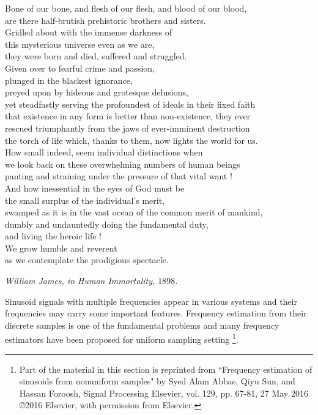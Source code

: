 \documentclass{UCF_ETD}
\begin{document}
\epigraph{ Bone of our bone, and flesh of our flesh, and 
blood of our blood, \\
are there half-brutish prehistoric brothers and sisters.\\
 Gridled about with the immense darkness of \\
 this  mysterious universe even as we are,\\
 they were born and died, suffered and struggled.\\
 Given over to fearful crime and passion,\\
 plunged in the blackest ignorance, \\
 preyed upon by hideous and grotesque delusions,\\
 yet steadfastly serving the profoundest of ideals in their fixed faith\\
 that existence in any form is better than non-existence, they ever \\
 rescued triumphantly from the jaws of ever-imminent destruction\\
 the torch of life which, thanks to them, now lights the world for us. \\
 How small indeed, seem individual distinctions when \\
 we look back on these overwhelming numbers of human beings\\
  panting and straining under the pressure of that vital want !\\
  And how inessential in the eyes of God must be\\
   the small surplus of the individual's merit,\\
   swamped as it is in the vast ocean of the common merit of mankind,\\
   dumbly and undauntedly doing the fundamental duty,\\
   and living the heroic life !\\
   We grow humble and reverent \\ as we contemplate the prodigious spectacle. }
{\itshape William James, in Human Immortality, $1898$.}

Sinusoid signals with multiple frequencies appear in various systems and their frequencies may carry some important features. Frequency estimation from their discrete samples is one of the fundamental
problems  and many frequency estimators have been proposed for uniform sampling setting \footnote{Part of the material in this section is reprinted from ``Frequency estimation of sinusoids from nonuniform samples" by Syed Alam Abbas, Qiyu Sun, and Hassan Foroosh, Signal Processing Elsevier, vol. 129, pp. 67-81, 27 May 2016 \copyright 2016 Elsevier, with permission from Elsevier.}.
\end{document}
